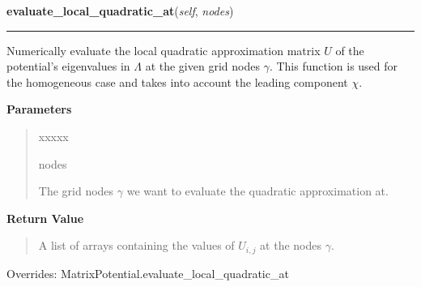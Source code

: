 \hspace{.8\funcindent}\begin{boxedminipage}{\funcwidth}

    \raggedright \textbf{evaluate\_local\_quadratic\_at}(\textit{self}, \textit{nodes})

    \vspace{-1.5ex}

    \rule{\textwidth}{0.5\fboxrule}
\setlength{\parskip}{2ex}
    Numerically evaluate the local quadratic approximation matrix $U$ of
    the potential's eigenvalues in $\Lambda$ at the given
    grid nodes $\gamma$. This function is used for the
    homogeneous case and takes into account the leading component
    $\chi$.

\setlength{\parskip}{1ex}
      \textbf{Parameters}
      \vspace{-1ex}

      \begin{quote}
        \begin{Ventry}{xxxxx}

          \item[nodes]

          The grid nodes $\gamma$ we want to evaluate the
          quadratic approximation at.

        \end{Ventry}

      \end{quote}

      \textbf{Return Value}
    \vspace{-1ex}

      \begin{quote}
      A list of arrays containing the values of $U_{i,j}$ at the nodes
      $\gamma$.

      \end{quote}



      Overrides: MatrixPotential.evaluate\_local\_quadratic\_at

    \end{boxedminipage}

    \vspace{0.5ex}

